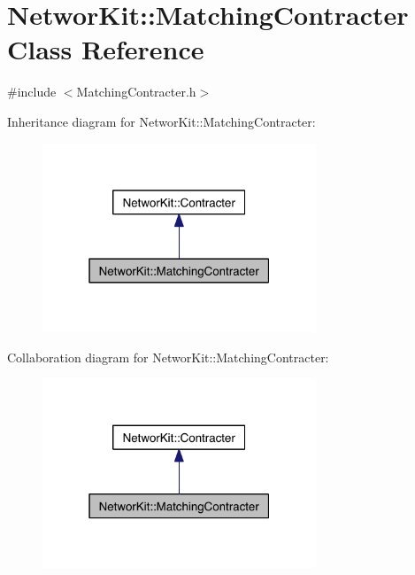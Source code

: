 \hypertarget{class_networ_kit_1_1_matching_contracter}{\section{Networ\-Kit\-:\-:Matching\-Contracter Class Reference}
\label{class_networ_kit_1_1_matching_contracter}
}


{\ttfamily \#include $<$Matching\-Contracter.\-h$>$}



Inheritance diagram for Networ\-Kit\-:\-:Matching\-Contracter\-:\nopagebreak
\begin{figure}[H]
\begin{center}
\leavevmode
\includegraphics[width=232pt]{class_networ_kit_1_1_matching_contracter__inherit__graph}
\end{center}
\end{figure}


Collaboration diagram for Networ\-Kit\-:\-:Matching\-Contracter\-:\nopagebreak
\begin{figure}[H]
\begin{center}
\leavevmode
\includegraphics[width=232pt]{class_networ_kit_1_1_matching_contracter__coll__graph}
\end{center}
\end{figure}
